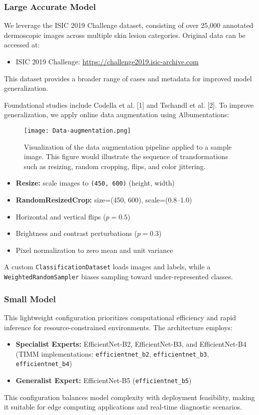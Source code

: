 \subsubsection*{Large Accurate Model}
We leverage the ISIC 2019 Challenge dataset, consisting of over 25,000 annotated dermoscopic images across multiple skin lesion categories. Original data can be accessed at:
\begin{itemize}
  \item ISIC 2019 Challenge: \url{https://challenge2019.isic-archive.com}
\end{itemize}
This dataset provides a broader range of cases and metadata for improved model generalization.

Foundational studies include Codella et al. [1] and Tschandl et al. [2]. To improve generalization, we apply online data augmentation using Albumentations:

\begin{figure}[H]
  \centering
\texttt{[image: Data-augmentation.png]}
  \caption{Visualization of the data augmentation pipeline applied to a sample image. This figure would illustrate the sequence of transformations such as resizing, random cropping, flips, and color jittering.}
  \label{fig:data-augmentation-pipeline}
\end{figure}

\begin{itemize}
\item \textbf{Resize:} scale images to \texttt{(450, 600)} (height, width)
\item \textbf{RandomResizedCrop:} size=(450, 600), scale=(0.8--1.0)
\item Horizontal and vertical flips ($p=0.5$)
\item Brightness and contrast perturbations ($p=0.3$)
\item Pixel normalization to zero mean and unit variance
\end{itemize}
A custom \texttt{ClassificationDataset} loads images and labels, while a \texttt{WeightedRandomSampler} biases sampling toward under-represented classes.

\subsubsection*{Small  Model}
This lightweight configuration prioritizes computational efficiency and rapid inference for resource-constrained environments. The architecture employs:
\begin{itemize}
  \item \textbf{Specialist Experts:} EfficientNet-B2, EfficientNet-B3, and EfficientNet-B4 (TIMM implementations: \texttt{efficientnet\_b2}, \texttt{efficientnet\_b3}, \texttt{efficientnet\_b4})
  \item \textbf{Generalist Expert:} EfficientNet-B5 (\texttt{efficientnet\_b5})
\end{itemize}
This configuration balances model complexity with deployment feasibility, making it suitable for edge computing applications and real-time diagnostic scenarios.

